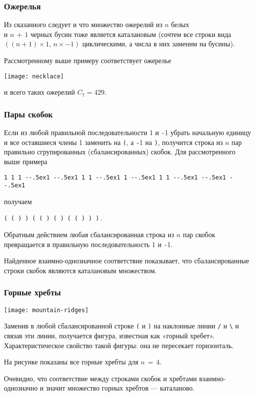 \documentclass[mathserif]{beamer}
\begin{document}
\begin{frame}[fragile]%
\frametitle{Ожерелья}

Из сказанного следует и что множество ожерелий из $n$ белых \\
и $n\,{+}\,1$ черных бусин тоже является каталановым (сочтем все строки вида $((n{+}1) \times 1,\,n \times -1)$ циклическими, а числа в них заменим на бусины).

\medskip

Рассмотренному выше примеру соответствует ожерелье

\bigskip

\centerline{\texttt{[image: necklace]}}

\bigskip

и всего таких ожерелий $C_7=429$.
\end{frame}

\begin{frame}[fragile]%
\frametitle{Пары скобок}
Если из любой правильной последовательности 1 и \verb.-.$\!$1 убрать начальную единицу и все оставшиеся члены 1 заменить на \verb.(., а \verb.-.$\!$1 на \verb.)., получится строка из $n$ пар правильно сгрупированных (сбалансированных) скобок.
Для рассмотренного выше примера
\begin{center}
\texttt{1 1 1 -\kern-.5ex1 -\kern-.5ex1 1 1 -\kern-.5ex1 1 -\kern-.5ex1 1 1 -\kern-.5ex1 -\kern-.5ex1 -\kern-.5ex1}
\end{center}
получаем
\begin{center}
\verb.( ( ) ) ( ( ) ( ) ( ( ) ) ).\,.
\end{center}

Обратным действием любая сбалансированная строка из $n$ пар скобок превращается в правильную последовательность 1 и \verb.-.$\!$1.

\bigskip

Найденное взаимно-однозначное соответствие показывает, что сбалансированные строки скобок являются каталановым множеством.
\end{frame}

\begin{frame}[fragile]%
\frametitle{Горные хребты}
\centerline{\texttt{[image: mountain-ridges]}}

\bigskip
\medskip

Заменив в любой сбалансированной строке \verb.(. и \verb.). на наклонные линии \verb./. и \verb.\. и связав эти линии, получается фигура, известная как «горный хребет».
Характеристическое свойство такой фигуры: она не пересекает горизонталь.

\bigskip

На рисунке показаны все горные хребты для $n\,{=}\,4$.

\bigskip

Очевидно, что соответствие между строками скобок и хребтами взаимно-однозначно и значит множество горных хребтов — каталаново.
\end{frame}
\end{document}
